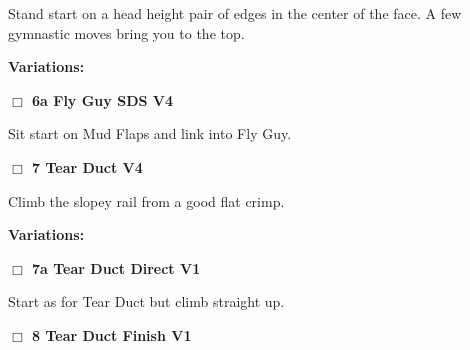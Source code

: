 \begin{multicols}{2}
\begin{adjustwidth}{1.3em}{}
Stand start on a head height pair of edges in the center of the face. A few gymnastic moves bring you to the top.
\end{adjustwidth}


\begin{adjustwidth}{0.5cm}{}				
\needspace{4em}
\textbf{Variations:} \newline

\needspace{2em}
\label{vr:Fly Guy SDS}
\colorbox{RoyalBlue!20}{
\parbox{0.95\linewidth}{
\hspace{-1ex}\textbf{$\Box$
6a Fly Guy SDS V4  
}}}
\begin{adjustwidth}{1.3em}{}			

Sit start on Mud Flaps and link into Fly Guy.
\end{adjustwidth}



\end{adjustwidth}


\needspace{2em}
\label{rt:Tear Duct}
\colorbox{RoyalBlue!20}{
\parbox{0.95\linewidth}{
\hspace{-1ex}\textbf{$\Box$
7 Tear Duct V4  
}}}
\begin{adjustwidth}{1.3em}{}			

Climb the slopey rail from a good flat crimp.
\end{adjustwidth}


\begin{adjustwidth}{0.5cm}{}				
\needspace{4em}
\textbf{Variations:} \newline

\needspace{2em}
\label{vr:Tear Duct Direct}
\colorbox{green!20}{
\parbox{0.95\linewidth}{
\hspace{-1ex}\textbf{$\Box$
7a Tear Duct Direct V1  
}}}
\begin{adjustwidth}{1.3em}{}			

Start as for Tear Duct but climb straight up.
\end{adjustwidth}



\end{adjustwidth}


\needspace{2em}
\label{rt:Tear Duct Finish}
\colorbox{green!20}{
\parbox{0.95\linewidth}{
\hspace{-1ex}\textbf{$\Box$
8 Tear Duct Finish V1  \warn\warn
}}}
\begin{adjustwidth}{1.3em}{}			


\end{adjustwidth}
\end{multicols}
